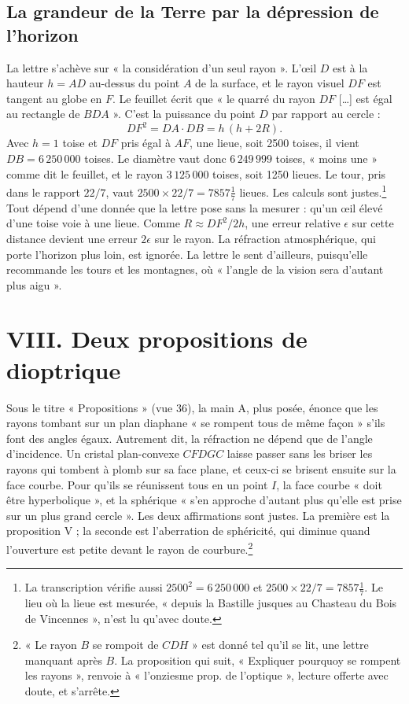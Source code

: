 \documentclass[11pt,a4paper]{article}
\begin{document}
\subsection*{La grandeur de la Terre par la dépression de l'horizon}

La lettre s'achève sur « la considération d'un seul rayon ». L'œil \(D\) est à
la hauteur \(h=AD\) au-dessus du point \(A\) de la surface, et le rayon visuel
\(DF\) est tangent au globe en \(F\). Le feuillet écrit que « le quarré du rayon
\(DF\) […] est égal au rectangle de \(BDA\) ». C'est la puissance du point
\(D\) par rapport au cercle :
\[
DF^2=DA\cdot DB=h\,(h+2R).
\]
Avec \(h=1\) toise et \(DF\) pris égal à \(AF\), une lieue, soit 2500 toises, il
vient \(DB=6\,250\,000\) toises. Le diamètre vaut donc \(6\,249\,999\) toises,
« moins une » comme dit le feuillet, et le rayon \(3\,125\,000\) toises, soit
1250 lieues. Le tour, pris dans le rapport \(22/7\), vaut \(2500\times22/7
=7857\frac17\) lieues. Les calculs sont justes.\footnote{La transcription
vérifie aussi \(2500^2=6\,250\,000\) et \(2500\times22/7=7857\frac17\). Le lieu
où la lieue est mesurée, « depuis la Bastille jusques au Chasteau du Bois de
Vincennes », n'est lu qu'avec doute.} Tout dépend d'une donnée que la lettre
pose sans la mesurer : qu'un œil élevé d'une toise voie à une lieue. Comme
\(R\approx DF^2/2h\), une erreur relative \(\epsilon\) sur cette distance
devient une erreur \(2\epsilon\) sur le rayon. La réfraction atmosphérique,
qui porte l'horizon plus loin, est ignorée. La lettre le sent d'ailleurs,
puisqu'elle recommande les tours et les montagnes, où « l'angle de la vision
sera d'autant plus aigu ».

\section*{VIII. Deux propositions de dioptrique}

Sous le titre « Propositions » (vue 36), la main A, plus posée, énonce que les
rayons tombant sur un plan diaphane « se rompent tous de même façon » s'ils
font des angles égaux. Autrement dit, la réfraction ne dépend que de l'angle
d'incidence. Un cristal plan-convexe \(CFDGC\) laisse passer sans les briser les
rayons qui tombent à plomb sur sa face plane, et ceux-ci se brisent ensuite sur
la face courbe. Pour qu'ils se réunissent tous en un point \(I\), la face
courbe « doit être hyperbolique », et la sphérique « s'en approche d'autant plus
qu'elle est prise sur un plus grand cercle ». Les deux affirmations sont
justes. La première est la proposition V ; la seconde est l'aberration de
sphéricité, qui diminue quand l'ouverture est petite devant le rayon de
courbure.\footnote{« Le rayon \(B\) se rompoit de \(CDH\) » est donné tel qu'il se
lit, une lettre manquant après \(B\). La proposition qui suit, « Expliquer
pourquoy se rompent les rayons », renvoie à « l'onziesme prop. de
l'optique », lecture offerte avec doute, et s'arrête.}
\end{document}
